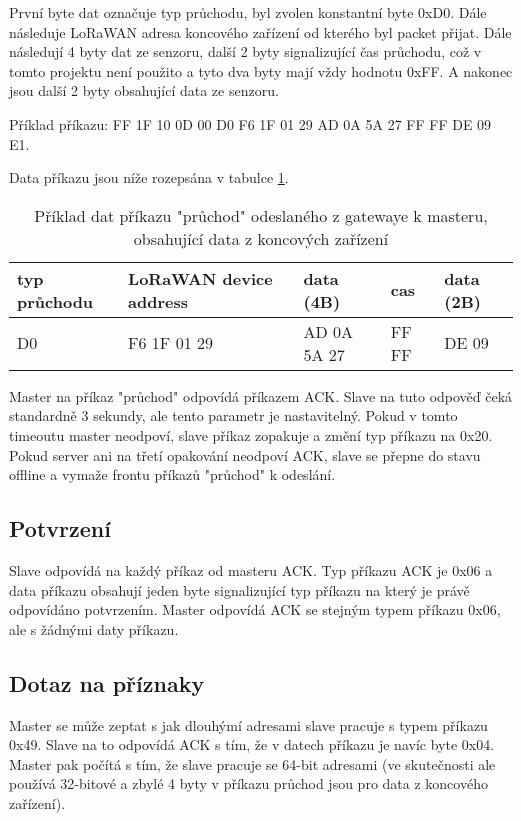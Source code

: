 První byte dat označuje typ průchodu, byl zvolen konstantní byte 0xD0. Dále následuje LoRaWAN adresa koncového zařízení od kterého byl packet přijat. Dále následují 4 byty dat ze senzoru, další 2 byty signalizující čas průchodu, což v tomto projektu není použito a tyto dva byty mají vždy hodnotu 0xFF. A nakonec jsou další 2 byty obsahující data ze senzoru.

Příklad příkazu: FF 1F 10 0D 00 D0 F6 1F 01 29 AD 0A 5A 27 FF FF DE 09 E1.

Data příkazu jsou níže rozepsána v tabulce \ref{table:prikladprikazpruchod}.

\begin{table}[!h]
    \centering
\begin{tabular}{ | p{1.5cm} | p{3cm} | p{2.5cm} | p{1.3cm} | p{1.3cm} |  }
 \hline
 typ průchodu & LoRaWAN device address & data (4B)     & cas   & data (2B) \\ \hline
 D0           & F6 1F 01 29            &  AD 0A 5A 27  & FF FF & DE 09     \\ 
 \hline
\end{tabular}
    \caption{Příklad dat příkazu "průchod" odeslaného z gatewaye k masteru, obsahující data z koncových zařízení}
    \label{table:prikladprikazpruchod}
\end{table}

Master na příkaz "průchod" odpovídá příkazem ACK. Slave na tuto odpověď čeká standardně 3 sekundy, ale tento parametr je nastavitelný. Pokud v tomto timeoutu master neodpoví, slave  příkaz zopakuje a změní typ příkazu na 0x20. Pokud server ani na třetí opakování neodpoví ACK, slave se přepne do stavu offline a vymaže frontu příkazů "průchod" k odeslání.

\subsection{Potvrzení}
Slave odpovídá na každý příkaz od masteru ACK. Typ příkazu ACK je 0x06 a data příkazu obsahují jeden byte signalizující typ příkazu na který je právě odpovídáno potvrzením.
Master odpovídá ACK se stejným typem příkazu 0x06, ale s žádnými daty příkazu.

\subsection{Dotaz na příznaky}
Master se může zeptat s jak dlouhýmí adresami slave pracuje s typem příkazu 0x49. Slave na to odpovídá ACK s tím, že v datech příkazu je navíc byte 0x04. Master pak počítá s tím, že slave pracuje se 64-bit adresami (ve skutečnosti ale používá 32-bitové a zbylé 4 byty v příkazu průchod jsou pro data z koncového zařízení).



